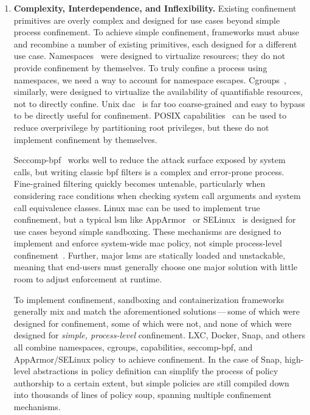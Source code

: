 \begin{enumerate}[font=\bfseries]
  \item \label{i:problem-complexity} \textbf{Complexity, Interdependence, and Inflexibility.}
    Existing confinement primitives are overly complex and designed for use cases beyond
    simple process confinement. To achieve simple confinement, frameworks must abuse and
    recombine a number of existing primitives, each designed for a different use case.
    Namespaces~\cite{biederman2006_namespaces, linux_namespaces} were designed to
    virtualize resources; they do not provide confinement by themselves. To truly confine
    a process using namespaces, we need a way to account for namespace escapes.
    Cgroups~\cite{cgroups}, similarly, were designed to virtualize the availability of
    quantifiable resources, not to directly confine. Unix
    \gls{dac}~\cite{jaeger2008_os_security, van_oorschot2020_tools_jewels} is far too
    coarse-grained and easy to bypass to be directly useful for confinement. POSIX
    capabilities~\cite{posix_capabilities} can be used to reduce overprivilege by
    partitioning root privileges, but these do not implement confinement by themselves.

    Seccomp-bpf~\cite{seccomp, edge2015_seccomp} works well to reduce the attack surface
    exposed by system calls, but writing classic \gls{bpf} filters is a complex and
    error-prone process. Fine-grained filtering quickly becomes untenable, particularly
    when considering race conditions when checking system call arguments and system call
    equivalence classes.  Linux \gls{mac} can be used to implement true confinement, but
    a typical \gls{lsm} like AppArmor~\cite{cowan2000_apparmor} or
    SELinux~\cite{smalley2001_selinux} is designed for use cases beyond simple sandboxing.
    These mechanisms are designed to implement and enforce system-wide \gls{mac} policy,
    not simple process-level confinement~\cite{belair2019_leveraging}. Further, major
    \glspl{lsm} are statically loaded and unstackable, meaning that end-users must
    generally choose one major solution with little room to adjust enforcement at runtime.

    To implement confinement, sandboxing and containerization frameworks generally mix and
    match the aforementioned solutions\,---\,some of which were designed for confinement,
    some of which were not, and none of which were designed for \textit{simple,
    process-level} confinement. LXC, Docker, Snap, and others all combine namespaces,
    cgroups, capabilities, seccomp-bpf, and AppArmor/SELinux policy to achieve
    confinement. In the case of Snap, high-level abstractions in policy definition can
    simplify the process of policy authorship to a certain extent, but simple policies
    are still compiled down into thousands of lines of policy soup, spanning multiple
    confinement mechanisms.


\end{enumerate}
